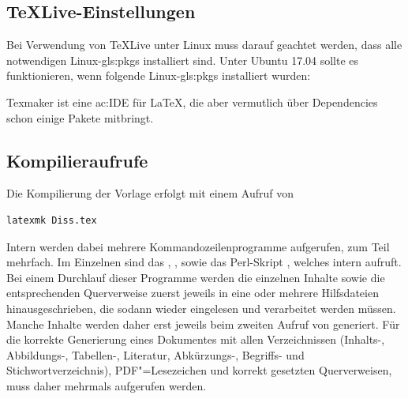 \subsection{TeXLive-Einstellungen}
\label{sec:TeXLive}
Bei Verwendung von TeXLive unter Linux muss darauf geachtet werden, dass alle notwendigen Linux-\glspl{gls:pkg} installiert sind.
Unter Ubuntu 17.04 sollte es funktionieren, wenn folgende Linux-\glspl{gls:pkg} installiert wurden:
\begin{itemize*}
	\item {}
	\item {}
	\item {}
	\item {}
	\item {}
	\item {}
	\item {}
	\item {}
\end{itemize*}
Texmaker ist eine \ac{ac:IDE} für \LaTeX, die aber vermutlich über Dependencies schon einige Pakete mitbringt.


\subsection{Kompilieraufrufe}
\label{sec:Aufruf}
Die Kompilierung der Vorlage erfolgt mit einem Aufruf von
\begin{verbatim}
latexmk Diss.tex
\end{verbatim}
Intern werden dabei mehrere Kommandozeilenprogramme aufgerufen, zum Teil mehrfach.
Im Einzelnen sind das 
, 
, 
sowie das Perl-Skript 
, 
welches intern  aufruft.
%
Bei einem Durchlauf dieser Programme
werden die einzelnen Inhalte sowie die entsprechenden Querverweise
zuerst jeweils in eine oder mehrere Hilfsdateien hinausgeschrieben,
die sodann wieder eingelesen und verarbeitet werden müssen.
Manche Inhalte werden daher erst jeweils beim zweiten Aufruf von  generiert.
Für die korrekte Generierung eines Dokumentes mit allen Verzeichnissen
(Inhalts-, Abbildungs-, Tabellen-, Literatur, Abkürzungs-, Begriffs- und Stichwortverzeichnis),
PDF"=Lesezeichen und korrekt gesetzten Querverweisen,
muss  daher mehrmals aufgerufen werden.

